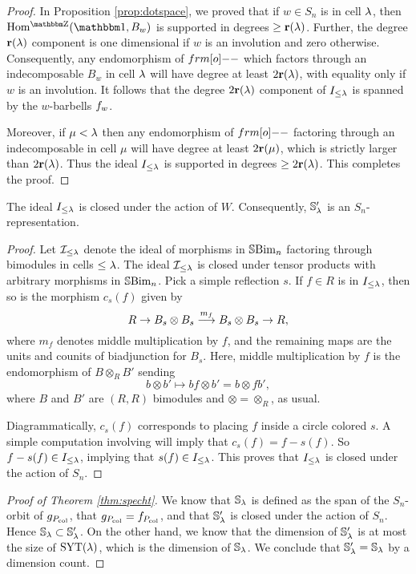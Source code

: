 \begin{proof}
In Proposition \ref{prop:dotspace}, we proved that if $w\in S_n$ is in  cell $\lambda$, then $\Homg(\one,B_w)$ is supported in degrees $\geq \mathbf{r}(\lambda)$.  Further, the degree $\mathbf{r}(\lambda)$ component is one dimensional if $w$ is an involution and zero otherwise.   Consequently, any endomorphism of $\one$ which factors through an indecomposable $B_w$ in cell $\lambda$ will have degree at least $2\mathbf{r}(\lambda)$, with equality only if $w$ is an involution.  It follows that the degree $2\mathbf{r}(\lambda)$ component of $I_{\leq\lambda}$ is spanned by the $w$-barbells $f_{w}$.

Moreover, if $\mu<\lambda$ then any endomorphism of $\one$ factoring through an indecomposable in cell $\mu$ will have degree at least $2\mathbf{r}(\mu)$, which is strictly larger than $2\mathbf{r}(\lambda)$. Thus the ideal $I_{\leq \lambda}$ is supported in degrees $\geq 2{\mathbf r}(\lambda)$.  This completes the proof.
\end{proof}

\begin{lemma}\label{lemma:specht2} The ideal $I_{\le \lambda}$ is closed under the action of $W$. Consequently, ${\mathbb{S}}_{\lambda}'$ is an $S_n$-representation. \end{lemma}
	
\begin{proof}  Let ${\mathcal{I}}_{\leq \lambda}$ denote the ideal of morphisms in ${\mathbb{S}}{\rm Bim }_n$ factoring through bimodules in cells $\leq \lambda$.   The ideal ${\mathcal{I}}_{\le \lambda}$ is closed under tensor products with arbitrary morphisms in ${\mathbb{S}}{\rm Bim }_n$.  Pick a simple reflection $s$. If $f\in R$ is in $I_{\le \lambda}$, then so is the morphism $c_s(f)$ given by
\[
R \to B_s \otimes B_s \buildrel m_f \over \longrightarrow B_s \otimes B_s \to R,
\]
where $m_f$ denotes middle multiplication by $f$, and the remaining maps are the units and counits of biadjunction for $B_s$.   Here, middle multiplication by $f$ is the endomorphism of $B\otimes_R B'$ sending
\[
b\otimes b'\mapsto bf\otimes b' = b\otimes fb',
\]
where $B$ and $B'$ are $(R,R)$ bimodules and $\otimes = \otimes_R$, as usual.

Diagrammatically, $c_s(f)$ corresponds to placing $f$ inside a circle colored $s$. A simple computation involving \cite[Equation 5.2]{EWsoergelCalc} will imply that $c_s(f)=f-s(f)$. So $f - s(f) \in I_{\le \lambda}$, implying that $s(f) \in I_{\le \lambda}$. This proves that $I_{\le \lambda}$ is closed under the action of $S_n$. \end{proof}

\begin{proof}[Proof of Theorem \ref{thm:specht}]
We know that ${\mathbb{S}}_\lambda$ is defined as the span of the $S_n$-orbit of $g_{P_{\operatorname{col}}}$, that $g_{P_{\operatorname{col}}} = f_{P_{\operatorname{col}}}$, and that ${\mathbb{S}}_\lambda'$ is closed under the action of $S_n$. Hence ${\mathbb{S}}_\lambda \subset {\mathbb{S}}_\lambda'$. On the other hand, we know that the dimension of ${\mathbb{S}}_\lambda'$ is at most the size of $\operatorname{SYT}(\lambda)$, which is the dimension of ${\mathbb{S}}_\lambda$. We conclude that ${\mathbb{S}}_\lambda'={\mathbb{S}}_\lambda$ by a dimension count.
\end{proof}

